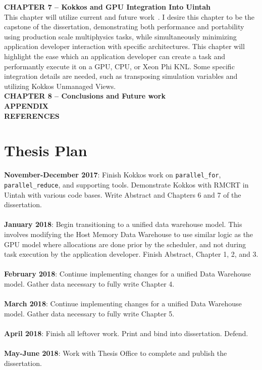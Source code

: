 \documentclass[12pt]{article}
\begin{document}
\textbf{CHAPTER 7 – Kokkos and GPU Integration Into Uintah}\\
This chapter will utilize current and future work~\cite{espm2-16,jocs18}.  I desire this chapter to be the capstone of the dissertation, demonstrating both performance and portability using production scale multiphysics tasks, while simultaneously minimizing application developer interaction with specific architectures.  This chapter will highlight the ease which an application developer can create a task and performantly execute it on a GPU, CPU, or Xeon Phi KNL.  Some specific integration details are needed, such as transposing simulation variables and utilizing Kokkos Unmanaged Views.\\  
\textbf{CHAPTER 8 – Conclusions and Future work}\\
\textbf{APPENDIX}\\
\textbf{REFERENCES}\\

\section{Thesis Plan}
\label{ch:thesis_plan}

\textbf{November-December 2017}: Finish Kokkos work on \texttt{parallel\_for}, \texttt{parallel\_reduce}, and supporting tools.  Demonstrate Kokkos with RMCRT in Uintah with various code bases.  Write Abstract and Chapters 6 and 7 of the dissertation.\\
\\
\textbf{January 2018}: Begin transitioning to a unified data warehouse model.  This involves modifying the Host Memory Data Warehouse to use similar logic as the GPU model where allocations are done prior by the scheduler, and not during task execution by the application developer.  Finish Abstract, Chapter 1, 2, and 3.\\
\\
\textbf{February 2018}: Continue implementing changes for a unified Data Warehouse model.  Gather data necessary to fully write Chapter 4.\\
\\
\textbf{March 2018}: Continue implementing changes for a unified Data Warehouse model.  Gather data necessary to fully write Chapter 5.  \\
\\
\textbf{April 2018}: Finish all leftover work.  Print and bind into dissertation.  Defend. \\
\\
\textbf{May-June 2018}: Work with Thesis Office to complete and publish the dissertation. \\
\end{document}
